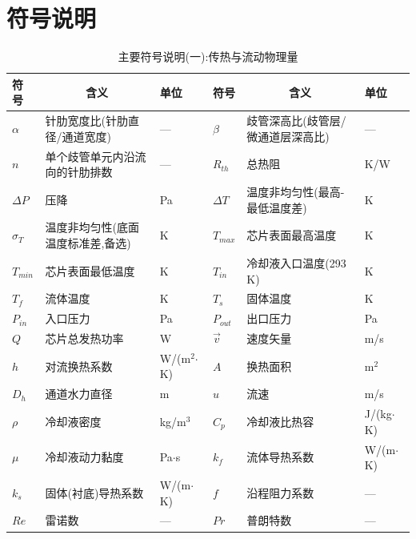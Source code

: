 %
\section{符号说明}

\begin{table}[H]
\centering
\small
\setlength{\tabcolsep}{2.5pt}
\caption{主要符号说明(一):传热与流动物理量}
\begin{tabular}{>{\centering\arraybackslash}p{1.55cm}p{4.45cm}>{\centering\arraybackslash}p{1.35cm}>{\centering\arraybackslash}p{1.55cm}p{4.45cm}>{\centering\arraybackslash}p{1.35cm}}
\toprule
符号 & \multicolumn{1}{c}{含义} & 单位 & 符号 & \multicolumn{1}{c}{含义} & 单位 \\
\midrule
$\alpha$   & 针肋宽度比(针肋直径/通道宽度) & — & $\beta$    & 歧管深高比(歧管层/微通道层深高比) & — \\
$n$        & 单个歧管单元内沿流向的针肋排数 & — & $R_{th}$   & 总热阻 & K/W \\
$\Delta P$ & 压降 & Pa & $\Delta T$ & 温度非均匀性(最高-最低温度差) & K \\
$\sigma_T$ & 温度非均匀性(底面温度标准差,备选) & K & $T_{max}$  & 芯片表面最高温度 & K \\
$T_{min}$  & 芯片表面最低温度 & K & $T_{in}$   & 冷却液入口温度(293 K) & K \\
$T_f$      & 流体温度 & K & $T_s$      & 固体温度 & K \\
$P_{in}$   & 入口压力 & Pa & $P_{out}$  & 出口压力 & Pa \\
$Q$        & 芯片总发热功率 & W & $\vec{v}$  & 速度矢量 & m/s \\
$h$        & 对流换热系数 & W/(m$^2$$\cdot$K) & $A$ & 换热面积 & m$^2$ \\
$D_h$      & 通道水力直径 & m & $u$        & 流速 & m/s \\
$\rho$     & 冷却液密度 & kg/m$^3$ & $C_p$      & 冷却液比热容 & J/(kg$\cdot$K) \\
$\mu$      & 冷却液动力黏度 & Pa$\cdot$s & $k_f$      & 流体导热系数 & W/(m$\cdot$K) \\
$k_s$      & 固体(衬底)导热系数 & W/(m$\cdot$K) & $f$        & 沿程阻力系数 & — \\
$Re$       & 雷诺数 & — & $Pr$       & 普朗特数 & — \\
\bottomrule
\end{tabular}
\end{table}


